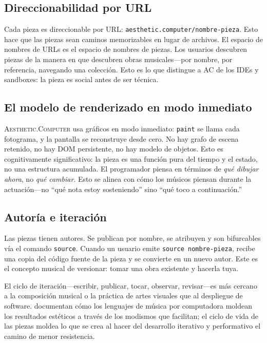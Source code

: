 \documentclass[10pt,letterpaper,twocolumn]{article}
\newcommand{\ac}{\textsc{Aesthetic.Computer}}
\begin{document}
\subsection{Direccionabilidad por URL}

Cada pieza es direccionable por URL: \texttt{aesthetic.computer/nombre-pieza}. Esto hace que las piezas sean caminos memorizables en lugar de archivos. El espacio de nombres de URLs es el espacio de nombres de piezas. Los usuarios descubren piezas de la manera en que descubren obras musicales---por nombre, por referencia, navegando una colección. Esto es lo que distingue a AC de los IDEs y sandboxes: la pieza es social antes de ser técnica.

\subsection{El modelo de renderizado en modo inmediato}

\ac{} usa gráficos en modo inmediato: \texttt{paint} se llama cada fotograma, y la pantalla se reconstruye desde cero. No hay grafo de escena retenido, no hay DOM persistente, no hay modelo de objetos. Esto es cognitivamente significativo: la pieza es una función pura del tiempo y el estado, no una estructura acumulada. El programador piensa en términos de \emph{qué dibujar ahora}, no \emph{qué cambiar}. Esto se alinea con cómo los músicos piensan durante la actuación---no ``qué nota estoy sosteniendo'' sino ``qué toco a continuación.''

\subsection{Autoría e iteración}

Las piezas tienen autores. Se publican por nombre, se atribuyen y son bifurcables vía el comando \texttt{source}. Cuando un usuario emite \texttt{source nombre-pieza}, recibe una copia del código fuente de la pieza y se convierte en un nuevo autor. Este es el concepto musical de versionar: tomar una obra existente y hacerla tuya.

El ciclo de iteración---escribir, publicar, tocar, observar, revisar---es más cercano a la composición musical o la práctica de artes visuales que al despliegue de software. \citet{mcpherson2020idiomatic} documentan cómo los lenguajes de música por computadora moldean los resultados estéticos a través de los modismos que facilitan; el ciclo de vida de las piezas moldea lo que se crea al hacer del desarrollo iterativo y performativo el camino de menor resistencia.
\end{document}
